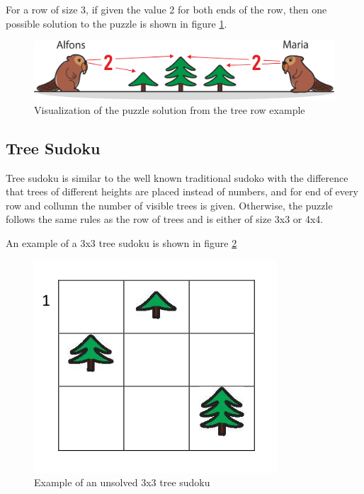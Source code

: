 \begin{example}
    For a row of size 3, if given the value 2 for both ends of the row, then one possible solution to the puzzle is shown in figure \ref{fig:tree_row_example}.
\end{example}

\begin{figure} 
    \centering
    \includegraphics[width=0.8 \columnwidth]{figures/tree_row_example.png}
    \caption{Visualization of the puzzle solution from the tree row example} 
    \label{fig:tree_row_example} 
\end{figure}

\subsection{Tree Sudoku}

Tree sudoku is similar to the well known traditional sudoko with the difference that trees of different heights are placed instead of numbers, and for end of every row and collumn the number of visible trees is given. Otherwise, the puzzle follows the same rules as the row of trees and is either of size 3x3 or 4x4.

\begin{example}
    An example of a 3x3 tree sudoku is shown in figure \ref{fig:tree_sudoku_example}
\end{example}

\begin{figure} 
    \centering
    \includegraphics[width=0.4 \columnwidth]{figures/tree_sudoku_example.png}
    \caption{Example of an unsolved 3x3 tree sudoku} 
    \label{fig:tree_sudoku_example} 
\end{figure}
